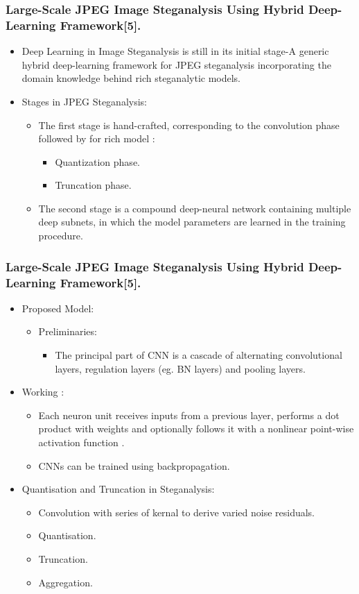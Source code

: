 \documentclass{beamer} %
\theoremstyle{definition} %
\begin{document}
\begin{frame}
\frametitle{Large-Scale JPEG Image Steganalysis Using Hybrid Deep-Learning Framework[5].}
\begin{itemize}
	\item Deep Learning in Image Steganalysis is still in its initial stage-A generic hybrid deep-learning framework for JPEG steganalysis incorporating the domain knowledge behind rich steganalytic models.
	\item Stages in JPEG Steganalysis:
	\begin{itemize}
		\item The first stage is hand-crafted, corresponding to the convolution phase followed by for rich model : 
		\begin{itemize}
            \item 	Quantization phase.  
            \item   Truncation phase.
		\end{itemize}
	    \item The second stage is a compound deep-neural network containing multiple deep subnets, in which the model parameters are learned in the training procedure. 
	\end{itemize}
\end{itemize}
\end{frame}
\begin{frame}
\frametitle{Large-Scale JPEG Image Steganalysis Using Hybrid Deep-Learning Framework[5]. }
\begin{itemize}
		\item Proposed Model:
	\begin{itemize}
		\item{Preliminaries: }
		\begin{itemize}
			\item 	The principal part of CNN is a cascade of alternating convolutional layers, regulation layers (eg. BN layers) and pooling layers.  
		\end{itemize}
\end{itemize}
\item Working : 
\begin{itemize}
	\item Each neuron unit receives inputs from a previous layer, performs a dot product with weights and optionally follows it with a nonlinear point-wise activation function .
	\item CNNs can be trained using backpropagation. 
\end{itemize}
\item Quantisation and Truncation in Steganalysis:
\begin{itemize}
	\item Convolution with series of kernal to derive varied noise residuals.
	\item Quantisation. 
	\item Truncation.
	\item Aggregation.  
\end{itemize}
\end{itemize}
\end{frame}
\end{document}
